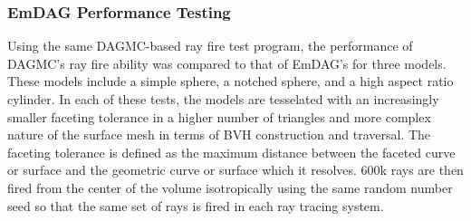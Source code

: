 \documentclass[12pt, a4paper]{article}
\begin{document}
\subsubsection{EmDAG Performance Testing}%

Using the same DAGMC-based ray fire test program, the performance of DAGMC's ray fire ability was compared to that of EmDAG's for three models. These models include a simple sphere, a notched sphere, and a high aspect ratio cylinder. In each of these tests, the models are tesselated with an increasingly smaller faceting tolerance in a higher number of triangles and more complex nature of the surface mesh in terms of BVH construction and traversal. The faceting tolerance is defined as the maximum distance between the faceted curve or surface and the geometric curve or surface which it resolves. 600k rays are then fired from the center of the volume isotropically using the same random number seed so that the same set of rays is fired in each ray tracing system.
\end{document}

